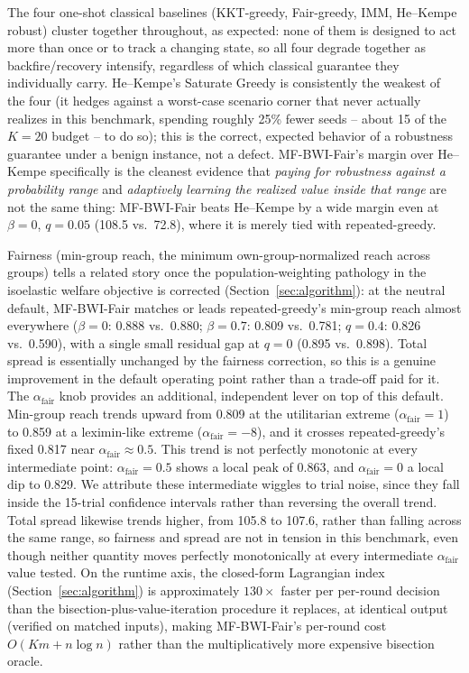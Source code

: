 \documentclass[journal]{IEEEtran}
\begin{document}
The four one-shot classical baselines (KKT-greedy, Fair-greedy, IMM,
He--Kempe robust) cluster together throughout, as expected: none of them
is designed to act more than once or to track a changing state, so all
four degrade together as backfire/recovery intensify, regardless of
which classical guarantee they individually carry. He--Kempe's Saturate
Greedy is consistently the weakest of the four (it hedges against a
worst-case scenario corner that never actually realizes in this
benchmark, spending roughly 25\% fewer seeds -- about 15 of the
$K=20$ budget -- to do so); this is the correct, expected behavior of a
robustness guarantee under a benign instance, not a defect. MF-BWI-Fair's
margin over He--Kempe specifically is the cleanest evidence that
\emph{paying for robustness against a probability range} and
\emph{adaptively learning the realized value inside that range} are not
the same thing: MF-BWI-Fair beats He--Kempe by a wide margin even at
$\beta=0$, $q=0.05$ (108.5 vs.\ 72.8), where it is merely tied with
repeated-greedy.

Fairness (min-group reach, the minimum own-group-normalized reach across
groups) tells a related story once the population-weighting pathology in
the isoelastic welfare objective is corrected (Section~\ref{sec:algorithm}):
at the neutral default, MF-BWI-Fair matches or leads repeated-greedy's
min-group reach almost everywhere ($\beta=0$: 0.888 vs.\ 0.880; $\beta=0.7$:
0.809 vs.\ 0.781; $q=0.4$: 0.826 vs.\ 0.590), with a single small residual
gap at $q=0$ (0.895 vs.\ 0.898). Total spread is essentially unchanged by
the fairness correction, so this is a genuine improvement in the
default operating point rather than a trade-off paid for it. The
$\alpha_{\mathrm{fair}}$ knob provides an additional, independent lever
on top of this default. Min-group reach trends upward from 0.809 at the
utilitarian extreme ($\alpha_{\mathrm{fair}}=1$) to 0.859 at a
leximin-like extreme ($\alpha_{\mathrm{fair}}=-8$), and it crosses
repeated-greedy's fixed 0.817 near $\alpha_{\mathrm{fair}}\approx0.5$.
This trend is not perfectly monotonic at every intermediate point:
$\alpha_{\mathrm{fair}}=0.5$ shows a local peak of 0.863, and
$\alpha_{\mathrm{fair}}=0$ a local dip to 0.829. We attribute these
intermediate wiggles to trial noise, since they fall inside the
15-trial confidence intervals rather than reversing the overall trend.
Total spread likewise trends higher, from 105.8 to 107.6, rather than
falling across the same range, so fairness and spread are not in tension
in this benchmark, even though neither quantity moves perfectly
monotonically at every intermediate $\alpha_{\mathrm{fair}}$ value
tested. On the runtime axis, the
closed-form Lagrangian index (Section~\ref{sec:algorithm}) is
approximately $130\times$ faster per per-round decision than the
bisection-plus-value-iteration procedure it replaces, at identical
output (verified on matched inputs), making MF-BWI-Fair's per-round cost
$O(Km+n\log n)$ rather than the multiplicatively more expensive
bisection oracle.
\end{document}
